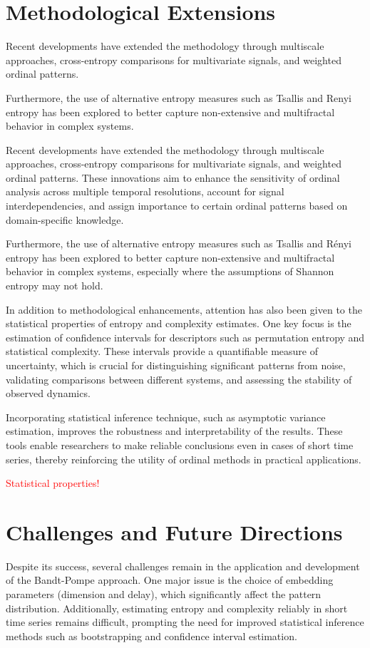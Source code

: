 \section{Methodological Extensions}
Recent developments have extended the methodology through multiscale approaches, cross-entropy comparisons for multivariate signals, and weighted ordinal patterns.

Furthermore, the use of alternative entropy measures such as Tsallis and Renyi entropy has been explored to better capture non-extensive and multifractal behavior in complex systems.

Recent developments have extended the methodology through multiscale approaches, cross-entropy comparisons for multivariate signals, and weighted ordinal patterns. These innovations aim to enhance the sensitivity of ordinal analysis across multiple temporal resolutions, account for signal interdependencies, and assign importance to certain ordinal patterns based on domain-specific knowledge.

Furthermore, the use of alternative entropy measures such as Tsallis and Rényi entropy has been explored to better capture non-extensive and multifractal behavior in complex systems, especially where the assumptions of Shannon entropy may not hold.

In addition to methodological enhancements, attention has also been given to the statistical properties of entropy and complexity estimates. One key focus is the estimation of confidence intervals for descriptors such as permutation entropy and statistical complexity. These intervals provide a quantifiable measure of uncertainty, which is crucial for distinguishing significant patterns from noise, validating comparisons between different systems, and assessing the stability of observed dynamics.

Incorporating statistical inference technique, such as asymptotic variance estimation, improves the robustness and interpretability of the results. These tools enable researchers to make reliable conclusions even in cases of short time series, thereby reinforcing the utility of ordinal methods in practical applications.

\textcolor{red}{Statistical properties!}

\section{Challenges and Future Directions}
Despite its success, several challenges remain in the application and development of the Bandt-Pompe approach. One major issue is the choice of embedding parameters (dimension and delay), which significantly affect the pattern distribution. Additionally, estimating entropy and complexity reliably in short time series remains difficult, prompting the need for improved statistical inference methods such as bootstrapping and confidence interval estimation.

